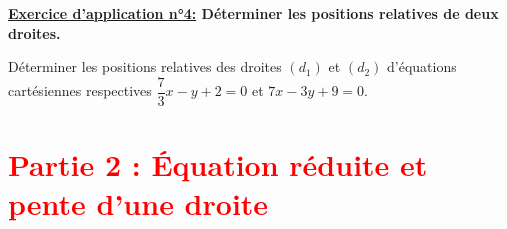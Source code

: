 \documentclass[12pt]{article}
\begin{document}
\begin{mdframed}[
    linewidth=1pt,
    roundcorner=5pt,
    linecolor=RoyalBlue,
    innertopmargin=10pt,
    innerbottommargin=10pt
]
{\color{RoyalBlue}
\textbf{\underline{Exercice d'application n°4:} Déterminer les positions relatives de deux droites.}}

\vspace{5pt}
Déterminer les positions relatives des droites $(d_1)$ et $(d_2)$ d'équations cartésiennes 
respectives $\dfrac{7}{3}x - y +2=0$ et 
$7x - 3y +9 = 0$.

\vspace{0.5cm}
{\color{black!30}\dotfill}

\vspace{0.5cm}
{\color{black!30}\dotfill}

\vspace{0.5cm}
{\color{black!30}\dotfill}

\vspace{0.5cm}
{\color{black!30}\dotfill}

\vspace{0.5cm}
{\color{black!30}\dotfill}

\vspace{0.5cm}
{\color{black!30}\dotfill}
\vspace{0.5cm}
{\color{black!30}\dotfill}

\vspace{0.5cm}
{\color{black!30}\dotfill}

\vspace{0.5cm}
{\color{black!30}\dotfill}

\vspace{0.5cm}
{\color{black!30}\dotfill}

\vspace{20pt}

\end{mdframed}


\newpage


\section*{\textcolor{red}{Partie 2 : Équation réduite et pente d'une droite}}

\vspace{5pt}
\end{document}
